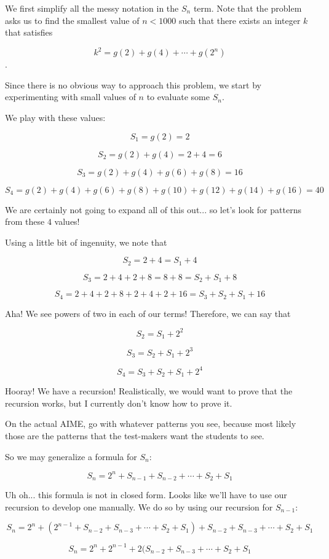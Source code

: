 \begin{enumerate}
 We first simplify all the messy notation in the $S_n$ term. Note that the problem asks us to find the smallest value of $n<1000$ such that there exists an integer $k$ that satisfies

 
 \[k^2 = g(2) + g(4) + \cdots + g(2^n)\].

 Since there is no obvious way to approach this problem, we start by experimenting with small values of $n$ to evaluate some $S_n$.

 We play with these values:

 
 \[S_1 = g(2) = 2\]

 \[S_2 = g(2) + g(4) = 2+4 = 6\]

 \[S_3 = g(2) + g(4) + g(6) + g(8) = 16\]

 \[S_4 =  g(2) + g(4) + g(6) + g(8) + g(10) +g(12)+g(14)+g(16) = 40\]

 We are certainly not going to expand all of this out... so let's look for patterns from these $4$ values!

 Using a little bit of ingenuity, we note that

 
 \[S_2 = 2+4 = S_1 + 4\]

 \[S_3 = 2+4+2+8 = 8+8 = S_2 + S_1 + 8\]

 \[S_4 = 2+4+2+8+2+4+2+16 = S_3 + S_2 + S_1 + 16\]

 Aha! We see powers of two in each of our terms! Therefore, we can say that 

 
 \[S_2 = S_1 + 2^2\]

 \[S_3 = S_2+S_1 + 2^3\]

 \[S_4 = S_3 + S_2 + S_1 + 2^4\]

 Hooray! We have a recursion! Realistically, we would want to prove that the recursion works, but I currently don't know how to prove it. 

 On the actual AIME, go with whatever patterns you see, because most likely those are the patterns that the test-makers want the students to see.

 So we may generalize a formula for $S_n$:

 
 \[S_n = 2^n + S_{n-1} + S_{n-2} + \cdots + S_2 + S_1\]

 Uh oh... this formula is not in closed form. Looks like we'll have to use our recursion to develop one manually. We do so by using our recursion for $S_{n-1}$:

 
 \[S_n = 2^n + (2^{n-1} + S_{n-2} + S_{n-3} + \cdots + S_2 + S_1) + S_{n-2} + S_{n-3} + \cdots + S_2 + S_1\]

 \[S_n = 2^n + 2^{n-1} + 2 (S_{n-2} + S_{n-3} + \cdots + S_2 + S_1\]


\end{enumerate}
